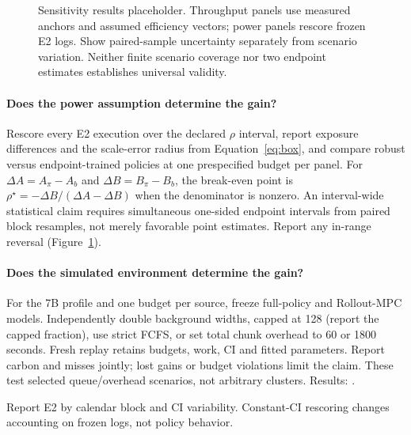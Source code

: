 \begin{figure}[t]
\centering
{}
\caption{Sensitivity results placeholder. Throughput panels use measured
anchors and assumed efficiency vectors; power panels rescore frozen E2 logs.
Show paired-sample uncertainty separately from scenario variation. Neither
finite scenario coverage nor two endpoint estimates establishes universal validity.}
\label{fig:power}
\end{figure}

\paragraph{Does the power assumption determine the gain?}
Rescore every E2 execution over the declared $\rho$ interval, report exposure
differences and the scale-error radius from Equation~\ref{eq:box}, and compare
robust versus endpoint-trained policies at one prespecified budget per panel.
For $\Delta A=A_\pi-A_b$ and $\Delta B=B_\pi-B_b$, the break-even point is
$\rho^\star=-\Delta B/(\Delta A-\Delta B)$ when the denominator is nonzero.
An interval-wide statistical claim requires simultaneous one-sided endpoint
intervals from paired block resamples, not merely favorable point estimates.
Report any in-range reversal (Figure~\ref{fig:power}).

\paragraph{Does the simulated environment determine the gain?}
For the 7B profile and one budget per source, freeze full-policy and Rollout-MPC
models. Independently double background widths, capped at 128 (report the
capped fraction), use strict FCFS, or set total chunk overhead to 60 or 1800
seconds. Fresh replay retains budgets, work, CI and fitted parameters. Report
carbon and misses jointly; lost gains or budget violations limit the claim.
These test selected queue/overhead scenarios, not arbitrary clusters.
Results: .

Report E2 by calendar block and CI variability. Constant-CI rescoring changes
accounting on frozen logs, not policy behavior.
